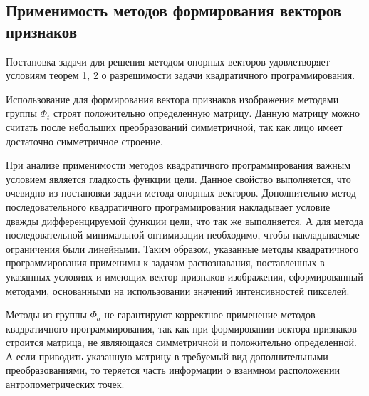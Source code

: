 \subsection{Применимость методов формирования векторов признаков}
Постановка задачи для решения методом опорных векторов удовлетворяет условиям теорем 1, 2 о разрешимости задачи квадратичного программирования.

Использование для формирования вектора признаков изображения методами группы $\Phi_t$ строят положительно определенную матрицу. Данную матрицу можно считать после небольших преобразований симметричной, так как лицо имеет достаточно симметричное строение.

При анализе применимости методов квадратичного программирования важным условием является гладкость функции цели. Данное свойство выполняется, что очевидно из постановки задачи метода опорных векторов. Дополнительно метод последовательного квадратичного программирования накладывает условие дважды дифференцируемой функции цели, что так же выполняется. А для метода последовательной минимальной оптимизации необходимо, чтобы накладываемые ограничения были линейными. Таким образом, указанные методы квадратичного программирования применимы к задачам распознавания, поставленных в указанных условиях и имеющих вектор признаков изображения, сформированный методами, основанными на использовании значений интенсивностей пикселей.

Методы из группы $\Phi_a$ не гарантируют корректное применение методов квадратичного программирования, так как при формировании вектора признаков строится матрица, не являющаяся симметричной и положительно определенной. А если приводить указанную матрицу в требуемый вид дополнительными преобразованиями, то теряется часть информации о взаимном расположении антропометрических точек.

